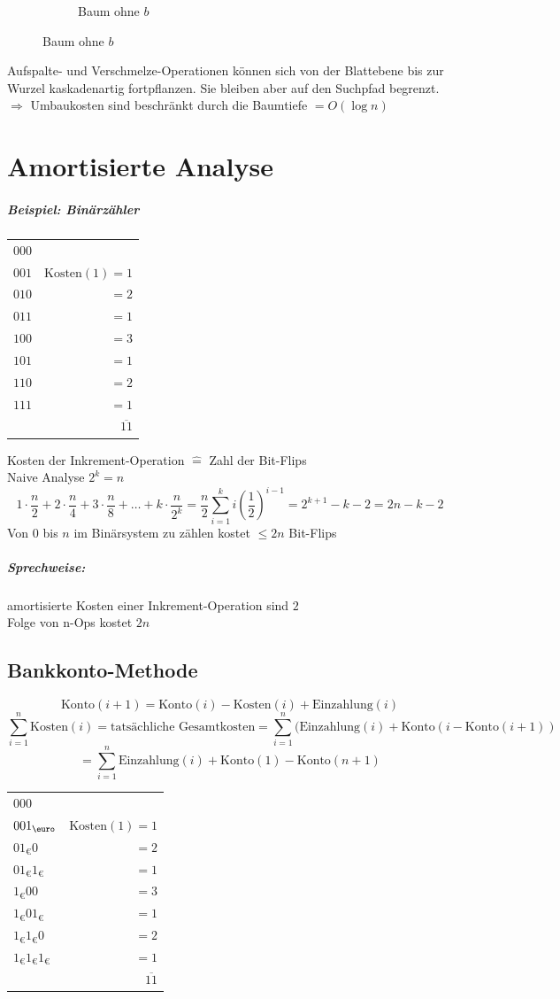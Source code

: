 \begin{figure}[H]
\begin{subfigure}[H]{0.4\linewidth}
		\caption{Baum ohne $b$}
		\label{fig:graph7}
	\end{subfigure}
\end{figure}
Aufspalte- und Verschmelze-Operationen können sich von der Blattebene bis zur Wurzel kaskadenartig fortpflanzen. Sie bleiben aber auf den Suchpfad begrenzt.\\
$\Rightarrow$ Umbaukosten sind beschränkt durch die Baumtiefe $=O(\log n)$
\chapter{Amortisierte Analyse}
\paragraph{Beispiel: Binärzähler}
	\begin{tabular}{lr}
		$000$& \\
		$001$&$\text{Kosten}(1)=1$\\
		$010$&$=2$\\
		$011$&$=1$\\
		$100$&$=3$\\
		$101$&$=1$\\
		$110$&$=2$\\
		$111$&$=1$\\
		 &$\overline{11}$
	\end{tabular}
	Kosten der Inkrement-Operation $\hat{=}$ Zahl der Bit-Flips\\
	Naive Analyse $2^k=n$
	\[1\cdot\frac{n}{2}+2\cdot\frac{n}{4}+3\cdot\frac{n}{8}+\ldots+k\cdot\frac{n}{2^k}=\frac{n}{2}\sum_{i=1}^{k}i(\frac{1}{2})^{i-1}=2^{k+1}-k-2=2n-k-2 \]
Von $0$ bis $n$ im Binärsystem zu zählen kostet  $\leq 2n$ Bit-Flips
\paragraph{Sprechweise:} amortisierte Kosten einer Inkrement-Operation sind $2$\\
Folge von n-Ops kostet $2n$
\section{Bankkonto-Methode}
\[\text{Konto}(i+1)=\text{Konto}(i)-\text{Kosten}(i)+\text{Einzahlung}(i) \]
\[\sum_{i=1}^{n}\text{Kosten}(i)=\text{tatsächliche Gesamtkosten} = \sum_{i=1}^{n}(\text{Einzahlung}(i)+\text{Konto}(i-\text{Konto}(i+1))\]
\[=\sum_{i=1}^{n}\text{Einzahlung}(i)+\text{Konto}(1)-\text{Konto}(n+1) \]
	\begin{tabular}{lr}
		$000$& \\
		$001_\text{\euro}$&$\text{Kosten}(1)=1$\\
		$01_\text{€}0$&$=2$\\
		$01_\text{€}1_\text{€}$&$=1$\\
		$1_\text{€}00$&$=3$\\
		$1_\text{€}01_\text{€}$&$=1$\\
		$1_\text{€}1_\text{€}0$&$=2$\\
		$1_\text{€}1_\text{€}1_\text{€}$&$=1$\\
		&$\overline{11}$
	\end{tabular}
	\pagebreak
